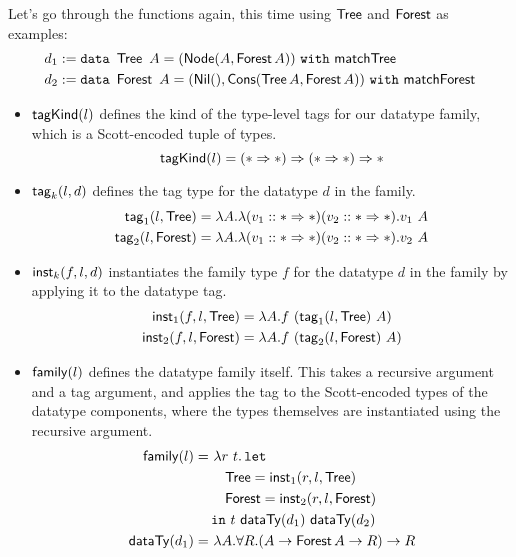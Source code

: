 \noindent Let's go through the functions again, this time using $\Tree$ and
$\Forest$ as examples:
\begin{align*}
d_1 &\defeq \datatype{\Tree}{A}{\textsf{matchTree}}{(\Node (A, \Forest A))}\\
d_2 &\defeq \datatype{\Forest}{A}{\textsf{matchForest}}{(\NNil(), \CCons(\Tree A, \Forest A))}
\end{align*}
\begin{itemize}
  \item $\tagKind{l}$ defines the kind of the type-level tags for our
    datatype family, which is a Scott-encoded tuple of types.
    $$\tagKind{l} = (\Type \kindArrow \Type) \kindArrow (\Type \kindArrow \Type) \kindArrow \Type$$
  \item $\dtTag{l}{d}{k}$ defines the tag type for the datatype $d$ in the family.
    \begin{align*}
    \dtTag{l}{\Tree}{1} &= \lambda A . \lambda (v_1 :: \Type \kindArrow \Type) (v_2 :: \Type \kindArrow \Type) . v_1\ A\\
    \dtTag{l}{\Forest}{2} &= \lambda A . \lambda (v_1 :: \Type \kindArrow \Type) (v_2 :: \Type \kindArrow \Type) . v_2\ A
    \end{align*}
  \item $\dtInst{f}{l}{d}{k}$ instantiates the family type $f$ for the
    datatype $d$ in the family by applying it to the datatype tag.
    \begin{align*}
    \dtInst{f}{l}{\Tree}{1} &= \lambda A . f\ (\dtTag{l}{\Tree}{1}\ A)\\
    \dtInst{f}{l}{\Forest}{2} &= \lambda A . f\ (\dtTag{l}{\Forest}{2}\ A)
    \end{align*}
  \item $\dtFamily{l}$ defines the datatype family itself. This takes a
    recursive argument and a tag argument, and applies the tag to the
    Scott-encoded types of the datatype components, where the types themselves
    are instantiated using the recursive argument.
    \begin{align*}
    \dtFamily{l} =&\ \lambda r\ t . \tlet \\
        &\quad\Tree = \dtInst{r}{l}{\Tree}{1}\\
        &\quad\Forest = \dtInst{r}{l}{\Forest}{2}\\
      &\tin\, t\ \scottTy{d_1}\ \scottTy{d_2}\\
    \scottTy{d_1} =&\ \lambda A . \forall R . (A \rightarrow \Forest A \rightarrow R) \rightarrow R\\

\end{align*}
\end{itemize}
